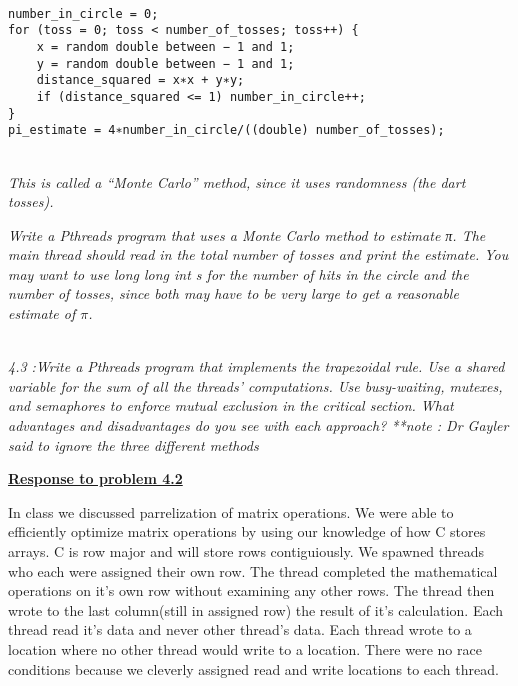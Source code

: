 \documentclass{article}
\begin{document}
\lstset{language=C,
	xleftmargin=16pt,
        framextopmargin=6pt,
        framexbottommargin=6pt, 
        frame=tb, framerule=0pt,}

\begin{lstlisting}

number_in_circle = 0;
for (toss = 0; toss < number_of_tosses; toss++) {
	x = random double between − 1 and 1;
	y = random double between − 1 and 1;
	distance_squared = x∗x + y∗y;
	if (distance_squared <= 1) number_in_circle++;
}
pi_estimate = 4∗number_in_circle/((double) number_of_tosses);

\end{lstlisting}

\noindent \emph
{
	\\This is called a “Monte Carlo” method, since it uses randomness (the dart
	tosses).
}

\emph
{
	Write a Pthreads program that uses a Monte Carlo method to estimate π.
	The main thread should read in the total number of tosses and print the estimate.
	You may want to use long long int s for the number of hits in the circle and
	the number of tosses, since both may have to be very large to get a reasonable
	estimate of $\pi$.
}

\bigskip

\emph
{
	\\4.3 :Write a Pthreads program that implements the trapezoidal rule. Use a shared
	variable for the sum of all the threads’ computations. Use busy-waiting,
	mutexes, and semaphores to enforce mutual exclusion in the critical section.
	What advantages and disadvantages do you see with each approach?
	**note : Dr Gayler said to ignore the three different methods
} 

\bigskip

\noindent \textbf{\underline{Response to problem 4.2}}

\bigskip

In class we discussed parrelization of matrix operations. We were able to efficiently
optimize matrix operations by using our knowledge of how C stores arrays.
C is row major and will store rows contiguiously. We spawned threads who each were
assigned their own row. The thread completed the mathematical operations on it's own row without
examining any other rows. The thread then wrote to the last column(still in assigned row) the result of it's
calculation. Each thread read it's data and never other thread's data. Each thread wrote to a location
where no other thread would write to a location. There were no race conditions because we
cleverly assigned read and write locations to each thread.
\end{document}
